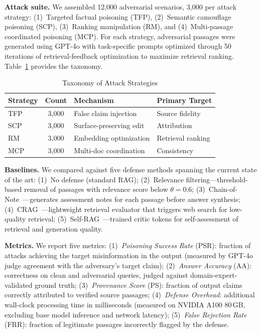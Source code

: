 \documentclass[journal,10pt]{IEEEtran}
\begin{document}
\textbf{Attack suite.} We assembled 12{,}000 adversarial scenarios, 3{,}000 per attack strategy: (1)~Targeted factual poisoning (TFP), (2)~Semantic camouflage poisoning (SCP), (3)~Ranking manipulation (RM), and (4)~Multi-passage coordinated poisoning (MCP). For each strategy, adversarial passages were generated using GPT-4o with task-specific prompts optimized through 50 iterations of retrieval-feedback optimization to maximize retrieval ranking. Table~\ref{tab:attack_taxonomy} provides the taxonomy.

\begin{table}[t]
\centering
\caption{Taxonomy of Attack Strategies}
\label{tab:attack_taxonomy}
\renewcommand{\arraystretch}{1.1}
\scriptsize
\begin{tabular}{@{}l c l l@{}}
\toprule
\textbf{Strategy} & \textbf{Count} & \textbf{Mechanism} & \textbf{Primary Target} \\
\midrule
TFP & 3{,}000 & False claim injection & Source fidelity \\
SCP & 3{,}000 & Surface-preserving edit & Attribution \\
RM & 3{,}000 & Embedding optimization & Retrieval ranking \\
MCP & 3{,}000 & Multi-doc coordination & Consistency \\
\bottomrule
\end{tabular}
\end{table}

\textbf{Baselines.} We compared against five defense methods spanning the current state of the art: (1)~No defense (standard RAG); (2)~Relevance filtering---threshold-based removal of passages with relevance score below $\theta = 0.6$; (3)~Chain-of-Note~\cite{yu2023chainofnote}---generates assessment notes for each passage before answer synthesis; (4)~CRAG~\cite{yan2024corrective}---lightweight retrieval evaluator that triggers web search for low-quality retrieval; (5)~Self-RAG~\cite{asai2024selfrag}---trained critic tokens for self-assessment of retrieval and generation quality.

\textbf{Metrics.} We report five metrics: (1)~\emph{Poisoning Success Rate} (PSR): fraction of attacks achieving the target misinformation in the output (measured by GPT-4o judge agreement with the adversary's target claim); (2)~\emph{Answer Accuracy} (AA): correctness on clean and adversarial queries, judged against domain-expert-validated ground truth; (3)~\emph{Provenance Score} (PS): fraction of output claims correctly attributed to verified source passages; (4)~\emph{Defense Overhead}: additional wall-clock processing time in milliseconds (measured on NVIDIA A100 80\,GB, excluding base model inference and network latency); (5)~\emph{False Rejection Rate} (FRR): fraction of legitimate passages incorrectly flagged by the defense.
\end{document}

